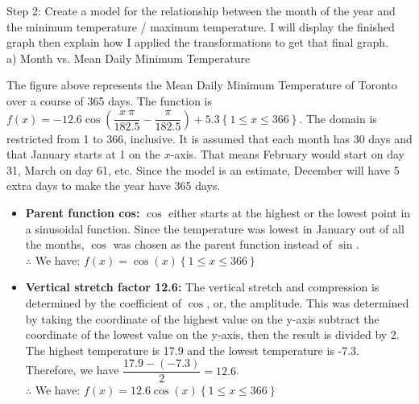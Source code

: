 \documentclass[12pt]{book}
\begin{document}
\begin{enumerate}
Step 2: Create a model for the relationship between the month of the year and the minimum temperature / maximum temperature. I will display the finished graph then explain how I applied the transformations to get that final graph.\\

a) Month vs. Mean Daily Minimum Temperature \\
\begin{figure}[H]
\end{figure}
The figure above represents the Mean Daily Minimum Temperature of Toronto over a course of 365 days. The function is $f\left(x\right)=-12.6\cos\left(\dfrac{x\ \pi}{182.5}-\dfrac{\pi}{182.5}\right)+5.3\left\{1\le x\le366\right\}$. The domain is restricted from 1 to 366, inclusive. It is assumed that each month has 30 days and that January starts at 1 on the $x$-axis. That means February would start on day 31, March on day 61, etc. Since the model is an estimate, December will have 5 extra days to make the year have 365 days. 
\begin{itemize} %
  \item \textbf{Parent function cos:} $\cos$ either starts at the highest or the lowest point in a sinusoidal function. Since the temperature was lowest in January out of all the months, $\cos$ was chosen as the parent function instead of $\sin$.\\
  $\therefore$ We have: $f(x) = \cos(x) \left\{1\le x\le 366\right\}$
  
  \item \textbf{Vertical stretch factor 12.6:} The vertical stretch and compression is determined by the coefficient of $\cos$, or, the amplitude. This was determined by taking the coordinate of the highest value on the y-axis subtract the coordinate of the lowest value on the y-axis, then the result is divided by 2. The highest temperature is 17.9 and the lowest temperature is -7.3. Therefore, we have $\dfrac{17.9 - (-7.3)}{2} = 12.6$.\\
  $\therefore$ We have: $f(x) = 12.6\cos(x) \left\{1\le x\le 366\right\}$
  

\end{itemize}
\end{enumerate}
\end{document}
